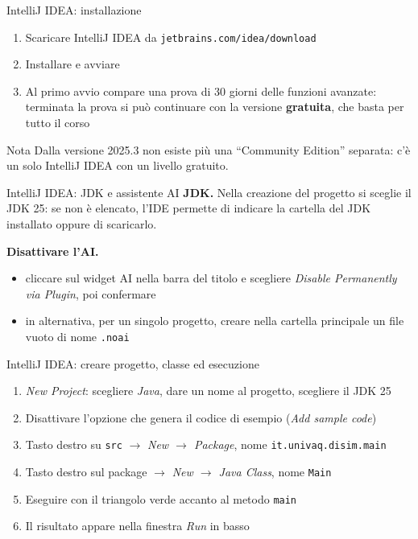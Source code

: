 \documentclass[aspectratio=169,10pt,t]{beamer}
\begin{document}
\begin{frame}{IntelliJ IDEA: installazione}
  \begin{enumerate}
    \item Scaricare IntelliJ IDEA da \texttt{jetbrains.com/idea/download}
    \item Installare e avviare
    \item Al primo avvio compare una prova di 30 giorni delle funzioni avanzate: terminata la prova si pu\`o continuare con la versione \textbf{gratuita}, che basta per tutto il corso
  \end{enumerate}
  \vspace{0.5em}
  \begin{alertblock}{Nota}
    Dalla versione 2025.3 non esiste pi\`u una ``Community Edition'' separata: c'\`e un solo IntelliJ IDEA con un livello gratuito.
  \end{alertblock}
\end{frame}

\begin{frame}{IntelliJ IDEA: JDK e assistente AI}
  \textbf{JDK.} Nella creazione del progetto si sceglie il JDK 25: se non \`e elencato, l'IDE permette di indicare la cartella del JDK installato oppure di scaricarlo.
  \vspace{0.8em}

  \textbf{Disattivare l'AI.}
  \begin{itemize}
    \item cliccare sul widget AI nella barra del titolo e scegliere \emph{Disable Permanently via Plugin}, poi confermare
    \item in alternativa, per un singolo progetto, creare nella cartella principale un file vuoto di nome \texttt{.noai}
  \end{itemize}
\end{frame}

\begin{frame}{IntelliJ IDEA: creare progetto, classe ed esecuzione}
  \begin{enumerate}
    \item \emph{New Project}: scegliere \emph{Java}, dare un nome al progetto, scegliere il JDK 25
    \item Disattivare l'opzione che genera il codice di esempio (\emph{Add sample code})
    \item Tasto destro su \texttt{src} $\rightarrow$ \emph{New $\rightarrow$ Package}, nome \texttt{it.univaq.disim.main}
    \item Tasto destro sul package $\rightarrow$ \emph{New $\rightarrow$ Java Class}, nome \texttt{Main}
    \item Eseguire con il triangolo verde accanto al metodo \texttt{main}
    \item Il risultato appare nella finestra \emph{Run} in basso
  \end{enumerate}
\end{frame}
\end{document}

